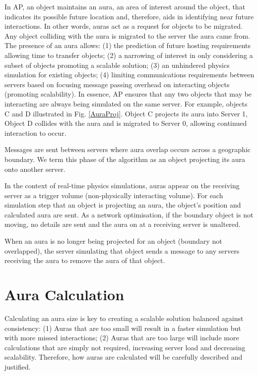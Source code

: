 In AP, an object maintains an aura, an area of interest around the object, that indicates its possible future location and, therefore, aids in identifying near future interactions. In other words, auras act as a request for objects to be migrated. Any object colliding with the aura is migrated to the server the aura came from. The presence of an aura allows: (1) the prediction of future hosting requirements allowing time to transfer objects; (2) a narrowing of interest in only considering a subset of objects promoting a scalable solution; (3) an unhindered physics simulation for existing objects; (4) limiting communications requirements between servers based on focusing message passing overhead on interacting objects (promoting scalability). In essence, AP ensures that any two objects that may be interacting are always being simulated on the same server. For example, objects C and D illustrated in Fig. \ref{AuraProj}. Object C projects its aura into Server 1, Object D collides with the aura and is migrated to Server 0, allowing continued interaction to occur.

Messages are sent between servers where aura overlap occurs across a geographic boundary. We term this phase of the algorithm as an object projecting its aura onto another server. %

In the context of real-time physics simulations, auras appear on the receiving server as a trigger volume (non-physically interacting volume). For each simulation step that an object is projecting an aura, the object's position and calculated aura are sent. As a network optimisation, if the boundary object is not moving, no details are sent and the aura on at a receiving server is unaltered.

When an aura is no longer being projected for an object (boundary not overlapped), the server simulating that object sends a message to any servers receiving the aura to remove the aura of that object.

\section{Aura Calculation}
Calculating an aura size is key to creating a scalable solution balanced against consistency: (1) Auras that are too small will result in a faster simulation but with more missed interactions; (2) Auras that are too large will include more calculations that are simply not required, increasing server load and decreasing scalability. Therefore, how auras are calculated will be carefully described and justified. 


